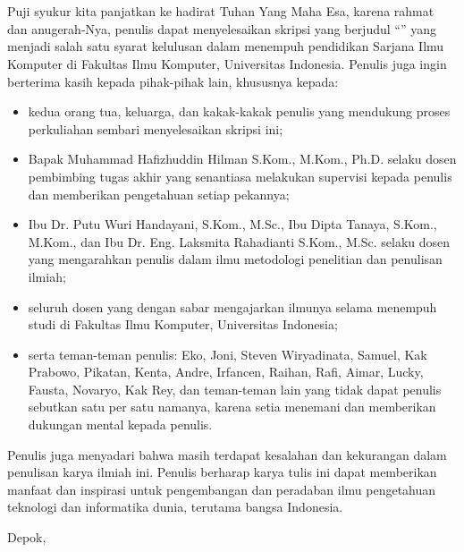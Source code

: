 \chapter*{\kataPengantar}
\pagestyle{first-pages}

Puji syukur kita panjatkan ke hadirat Tuhan Yang Maha Esa, karena rahmat dan anugerah-Nya, penulis dapat menyelesaikan skripsi yang berjudul “\judul” yang menjadi salah satu syarat kelulusan dalam menempuh pendidikan Sarjana Ilmu Komputer di  Fakultas Ilmu Komputer, Universitas Indonesia. Penulis juga ingin berterima kasih kepada pihak-pihak lain, khususnya kepada:

\begin{itemize}
    \setlength\itemsep{-0.5em}
    \item kedua orang tua, keluarga, dan kakak-kakak penulis yang mendukung proses perkuliahan sembari menyelesaikan skripsi ini;
    \item Bapak Muhammad Hafizhuddin Hilman S.Kom., M.Kom., Ph.D. selaku dosen pembimbing tugas akhir yang senantiasa melakukan supervisi kepada penulis dan memberikan pengetahuan setiap pekannya;
    \item Ibu Dr. Putu Wuri Handayani, S.Kom., M.Sc., Ibu Dipta Tanaya, S.Kom., M.Kom., dan Ibu Dr. Eng. Laksmita Rahadianti S.Kom., M.Sc. selaku dosen yang mengarahkan penulis dalam ilmu metodologi penelitian dan penulisan ilmiah;
    \item seluruh dosen yang dengan sabar mengajarkan ilmunya selama menempuh studi di Fakultas Ilmu Komputer, Universitas Indonesia;
    \item serta teman-teman penulis: Eko, Joni, Steven Wiryadinata, Samuel, Kak Prabowo, Pikatan, Kenta, Andre, Irfancen, Raihan, Rafi, Aimar, Lucky, Fausta, Novaryo, Kak Rey, dan teman-teman lain yang tidak dapat penulis sebutkan satu per satu namanya, karena setia menemani dan memberikan dukungan mental kepada penulis.
\end{itemize}

Penulis juga menyadari bahwa masih terdapat kesalahan dan kekurangan dalam penulisan karya ilmiah ini. Penulis berharap karya tulis ini dapat memberikan manfaat dan inspirasi untuk pengembangan dan peradaban ilmu pengetahuan teknologi dan informatika dunia, terutama bangsa Indonesia.

\vspace*{0.1cm}
\begin{flushright}
Depok, \tanggalSiapSidang\\[0.1cm]
\vspace*{1.5cm}
\penulis

\end{flushright}
